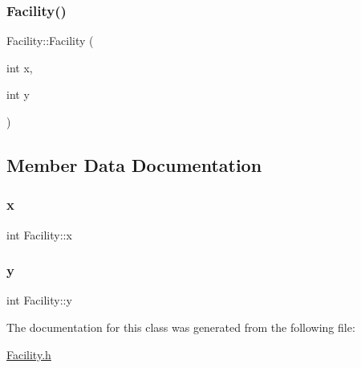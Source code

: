 \subsubsection{\texorpdfstring{Facility()}{Facility()}}
{\footnotesize\ttfamily Facility\+::\+Facility (\begin{DoxyParamCaption}\item[{int}]{x,  }\item[{int}]{y }\end{DoxyParamCaption})}



\subsection{Member Data Documentation}
\mbox{\label{classFacility_a97a4d1f6f807e0e74c4283cf120daed9}} 
\subsubsection{\texorpdfstring{x}{x}}
{\footnotesize\ttfamily int Facility\+::x\hspace{0.3cm}{\ttfamily [protected]}}

\mbox{\label{classFacility_a28d1fbfe0699e800db094161504b0e44}} 
\subsubsection{\texorpdfstring{y}{y}}
{\footnotesize\ttfamily int Facility\+::y\hspace{0.3cm}{\ttfamily [protected]}}



The documentation for this class was generated from the following file\+:\begin{DoxyCompactItemize}
\item 
\mbox{\hyperlink{Facility_8h}{Facility.\+h}}\end{DoxyCompactItemize}

